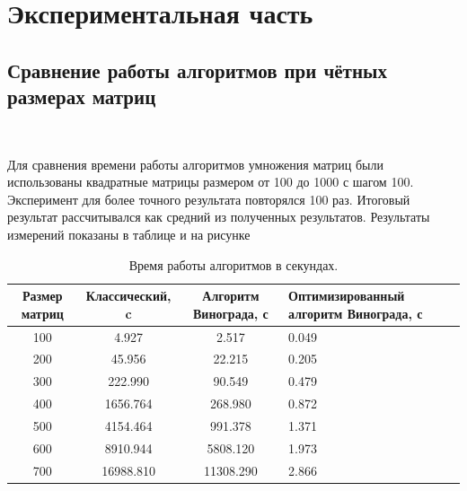 \documentclass[12pt]{report}
\begin{document}
	
	\chapter{Экспериментальная часть}
	
	
	
	\section{Сравнение работы алгоритмов при чётных размерах матриц}
	
	~\
	
	Для сравнения времени работы алгоритмов умножения матриц были использованы квадратные матрицы размером от 100 до 1000 с шагом 100. Эксперимент для более точного результата повторялся 100 раз. Итоговый результат рассчитывался как средний из полученных результатов. Результаты измерений показаны в таблице и на рисунке 
	
	\begin{table}[h]
		\caption{\label{tab:time1} Время работы алгоритмов в секундах. }
		\begin{center}
			\begin{tabular}{|c|c|c|p{3.8cm}|}
				\hline
				Размер матриц & Классический, c & Алгоритм Винограда, с & Оптимизированный алгоритм Винограда, с \\ [0.5ex] 
				\hline
				100 & 4.927 & 2.517 & 0.049\\
				\hline
				200 & 45.956 & 22.215 & 0.205\\
				\hline
				300 & 222.990 & 90.549 & 0.479\\
				\hline
				400 & 1656.764 & 268.980 & 0.872\\
				\hline
				500 & 4154.464 & 991.378 & 1.371\\
				\hline
				600 & 8910.944 & 5808.120 & 1.973\\
				\hline
				700 & 16988.810 & 11308.290 & 2.866\\
				\hline
			\end{tabular}
		\end{center}
	\end{table}

\end{document}
